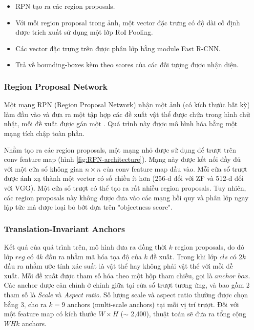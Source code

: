 \begin{itemize}
	\itemsep0em
	\item RPN tạo ra các region proposals.
	\item Với mỗi region proposal trong ảnh, một vector đặc trưng có độ dài cố định được trích xuất sử dụng một lớp RoI Pooling.
	\item Các vector đặc trưng trên được phân lớp bằng module Fast R-CNN.
	\item Trả về bounding-boxes kèm theo scores của các đối tượng được nhận diện.
\end{itemize}

\subsubsection*{Region Proposal Network}
Một mạng RPN (Region Proposal Network) nhận một ảnh (có kích thước bất kỳ) làm đầu vào và đưa ra một tập hợp các đề xuất vật thể được chứa trong hình chữ nhật, mỗi đề xuất được gán một . Quá trình này được mô hình hóa bằng một mạng tích chập toàn phần.

Nhằm tạo ra các region proposals, một mạng nhỏ được sử dụng để trượt trên conv feature map (hình \ref{fig:RPN-architecture}). Mạng này được kết nối đầy đủ với một cửa sổ không gian $n \times n$ của conv feature map đầu vào. Mỗi cửa sổ trượt được ánh xạ thành một vector có số chiều ít hơn (256-d đối với ZF và 512-d đối với VGG). Một cửa sổ trượt có thể tạo ra rất nhiều region proposals. Tuy nhiên, các region proposals này không được đưa vào các mạng hồi quy và phân lớp ngay lập tức mà được loại bỏ bớt dựa trên "objectness score".

\subsubsection*{Translation-Invariant Anchors}
Kết quả của quá trình trên, mô hình đưa ra đồng thời $k$ region proposals, do đó lớp $reg$ có $4k$ đầu ra nhằm mã hóa tọa độ của $k$ đề xuất. Trong khi lớp $cls$ có $2k$ đầu ra nhằm ước tính xác suất là vật thể hay không phải vật thể với mỗi đề xuất. Mỗi đề xuất được tham số hóa theo một hộp tham chiếu, gọi là $anchor$ $ box$. Các anchor được căn chỉnh ở chính giữa tại cửa sổ trượt tương ứng, và bao gồm 2 tham số là \textit{Scale} và \textit{Aspect ratio}. Số lượng scale và aspect ratio thường được chọn bằng 3, cho ra $k=9$ anchors (multi-scale anchors) tại mỗi vị trí trượt.
Đối với một feature map có kích thước $W \times H$ ($\sim$ 2,400), thuật toán sẽ đưa ra tổng cộng $W H k$ anchors.

